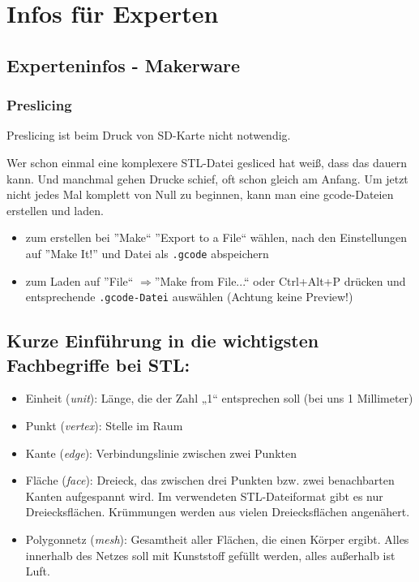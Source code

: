 \documentclass{\basedir/fablab-document}
\newcommand{\fachbegriff}[1]{(\textit{#1})}
\newcommand{\ra}{$\Rightarrow$}
\begin{document}

\section{Infos für Experten}

\subsection{Experteninfos - Makerware} \label{expinfos}
\subsubsection{Preslicing}
Preslicing ist beim Druck von SD-Karte nicht notwendig.

Wer schon einmal eine komplexere STL-Datei gesliced hat weiß, dass das dauern kann. Und manchmal gehen Drucke schief,
oft schon gleich am Anfang. Um jetzt nicht jedes Mal komplett von Null zu beginnen, kann man eine gcode-Dateien erstellen
und laden.
\begin{itemize}
\item zum erstellen bei ''Make`` ''Export to a File`` wählen, nach den Einstellungen auf ''Make It!'' und Datei als \texttt{.gcode} abspeichern
\item zum Laden auf ''File`` \ra ''Make from File...`` oder Ctrl+Alt+P drücken und entsprechende \texttt{.gcode-Datei} auswählen (Achtung keine Preview!)
\end{itemize}

\subsection{Kurze Einführung in die wichtigsten Fachbegriffe bei STL:}

\begin{itemize}
\item Einheit \fachbegriff{unit}: Länge, die der Zahl „1“ entsprechen soll (bei uns
1 Millimeter)
\item Punkt \fachbegriff{vertex}: Stelle im Raum
\item Kante \fachbegriff{edge}: Verbindungslinie zwischen zwei Punkten
\item Fläche \fachbegriff{face}: Dreieck, das zwischen drei Punkten bzw. zwei
benachbarten Kanten aufgespannt wird. Im verwendeten STL-Dateiformat
gibt es nur Dreiecksflächen. Krümmungen werden aus vielen
Dreiecksflächen angenähert.
\item Polygonnetz \fachbegriff{mesh}: Gesamtheit aller Flächen, die einen Körper
ergibt. Alles innerhalb des Netzes soll mit Kunststoff gefüllt werden,
alles außerhalb ist Luft.
\end{itemize}
\end{document}
